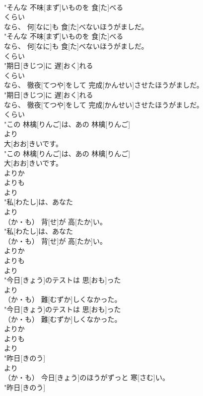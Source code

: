 \documentclass[8pt]{extreport}
\begin{document}
\begin{CJK}{UTF8}{min}
\\	"そんな 不味[まず]いものを 食[た]べる
\\	くらい
\\	なら、 何[なに]も 食[た]べないほうがましだ。
\\	"そんな 不味[まず]いものを 食[た]べる
\\	なら、 何[なに]も 食[た]べないほうがましだ。
\\	くらい
\\	"期日[きじつ]に 遅[おく]れる
\\	くらい
\\	なら、 徹夜[てつや]をして 完成[かんせい]させたほうがましだ。
\\	"期日[きじつ]に 遅[おく]れる
\\	なら、 徹夜[てつや]をして 完成[かんせい]させたほうがましだ。
\\	くらい
\\	"この 林檎[りんご]は、あの 林檎[りんご]
\\	より
\\	大[おお]きいです。
\\	"この 林檎[りんご]は、あの 林檎[りんご]
\\	大[おお]きいです。
\\	よりか 
\\	よりも	
\\	より
\\	"私[わたし]は、あなた
\\	より
\\	（か・も） 背[せ]が 高[たか]い。
\\	"私[わたし]は、あなた
\\	（か・も） 背[せ]が 高[たか]い。
\\	よりか 
\\	よりも	
\\	より
\\	"今日[きょう]のテストは 思[おも]った
\\	より
\\	（か・も） 難[むずか]しくなかった。
\\	"今日[きょう]のテストは 思[おも]った
\\	（か・も） 難[むずか]しくなかった。
\\	よりか 
\\	よりも	
\\	より
\\	"昨日[きのう]
\\	より
\\	（か・も） 今日[きょう]のほうがずっと 寒[さむ]い。
\\	"昨日[きのう]

\end{CJK}
\end{document}
